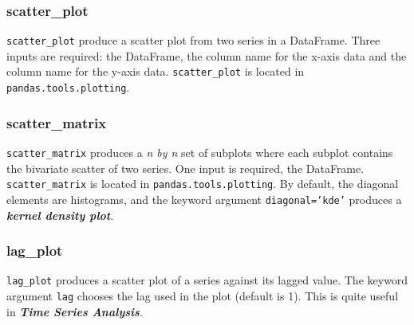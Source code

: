 \documentclass[KSmain.tex]{subfiles}
\begin{document}
	\subsubsection{scatter\_plot}
	\texttt{scatter\_plot} produce a scatter plot from two series in a DataFrame. Three inputs are required: the
	DataFrame, the column name for the x-axis data and the column name for the y-axis data. \texttt{scatter\_plot}
	is located in \texttt{pandas.tools.plotting}.
	\subsubsection{scatter\_matrix}
	\texttt{scatter\_matrix} produces a \textit{n by n} set of subplots where each subplot contains the bivariate scatter of
	two series. One input is required, the DataFrame. \texttt{scatter\_matrix} is located in \texttt{pandas.tools.plotting}.
	By default, the diagonal elements are histograms, and the keyword argument \texttt{diagonal=’kde’} produces a
	\textbf{\textit{kernel density plot}}.
	\subsubsection{lag\_plot}
	\texttt{lag\_plot} produces a scatter plot of a series against its lagged value. The keyword argument \texttt{lag} chooses
	the lag used in the plot (default is 1). This is quite useful in \textbf{\textit{Time Series Analysis}}.
\end{document}
